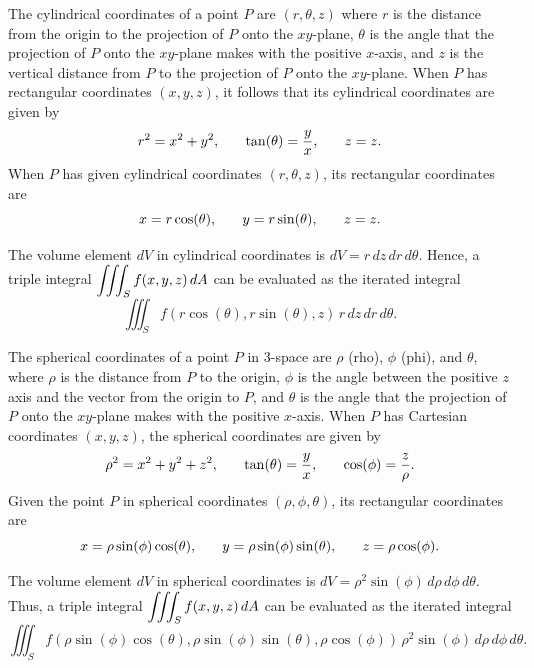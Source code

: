 \begin{summary}

\item The cylindrical coordinates of a point $P$ are $(r,\theta,z)$ where $r$ is the distance from the origin to the projection of $P$ onto the $xy$-plane, $\theta$ is the angle that the projection of $P$ onto the $xy$-plane makes with the positive $x$-axis, and $z$ is the vertical distance from $P$ to the projection of $P$ onto the $xy$-plane.  When $P$ has rectangular coordinates $(x,y,z)$, it follows that  its cylindrical coordinates are given by
\[r^2  = x^2  + y^2, \hspace{0.25in} \tan(\theta) = \frac{y}{x}, \hspace{0.25in} z = z.\]
When $P$ has given cylindrical coordinates $(r,\theta,z)$, its rectangular coordinates are 
\[x = r \cos(\theta), \hspace{0.25in} y = r \sin(\theta), \hspace{0.25in} z = z.\]
\item The volume element $dV$ in cylindrical coordinates is $dV = r \, dz \, dr \, d\theta$. Hence, a triple integral $\displaystyle \iiint_S f(x,y,z) \, dA$ can be evaluated as the iterated integral
    \[\iiint_S f(r\cos(\theta), r\sin(\theta), z) \, r \, dz \, dr \, d\theta.\]
\item The spherical coordinates of a point $P$ in 3-space are $\rho$ (rho), $\phi$ (phi), and $\theta$, where $\rho$ is the distance from $P$ to the origin, $\phi$ is the angle between the positive $z$ axis and the vector from the origin to $P$, and $\theta$ is the angle that the projection of $P$ onto the $xy$-plane makes with the positive $x$-axis.  When $P$ has Cartesian coordinates $(x,y,z)$, the spherical coordinates are given by
\[\rho^2  = x^2  + y^2 + z^2, \hspace{0.25in} \tan(\theta) = \frac{y}{x}, \hspace{0.25in} \cos(\phi) = \frac{z}{\rho}.\]
Given the point $P$ in spherical coordinates $(\rho, \phi, \theta)$, its rectangular coordinates are 
\[x = \rho \sin(\phi) \cos(\theta), \hspace{0.25in} y = \rho \sin(\phi) \sin(\theta), \hspace{0.25in} z = \rho \cos(\phi).\]
\item The volume element $dV$ in spherical coordinates is $dV = \rho^2 \sin(\phi) \, d\rho \, d\phi \, d\theta$. Thus, a triple integral $\displaystyle \iiint_S f(x,y,z) \, dA$ can be evaluated as the iterated integral
    \[\iiint_S f(\rho\sin(\phi)\cos(\theta), \rho \sin(\phi) \sin(\theta), \rho \cos(\phi)) \, \rho^2 \sin(\phi) \, d\rho \, d\phi \, d\theta.\]
\end{summary}


\nin \hrulefill



\clearpage
